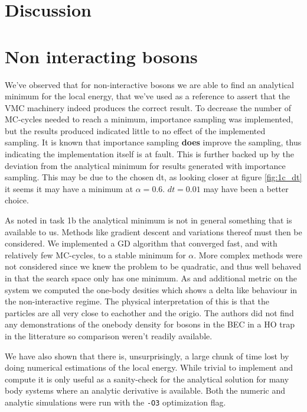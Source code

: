 \section{Discussion}
\section{Non interacting bosons}

We've observed that for non-interactive bosons we are able to find an analytical minimum for the local energy, that we've used as a reference to assert that the VMC machinery indeed produces the correct result. To decrease the number of MC-cycles needed to reach a minimum, importance sampling was implemented, but the results produced indicated little to no effect of the implemented sampling.
It is known that importance sampling \textbf{does} improve the sampling, thus indicating the implementation itself is at fault. This is further backed up by the deviation from the analytical minimum
for results generated with importance sampling. This may be due to the chosen dt, as looking closer at figure \ref{fig:1c_dt} it seems it may have a minimum at $\alpha = 0.6$. $dt = 0.01$ may have been
a better choice.

As noted in task 1b the analytical minimum is not in general something that is available to us.
Methods like gradient descent and variations thereof must then be considered. We implemented a GD algorithm that converged fast, and with relatively few MC-cycles, to a stable minimum for $\alpha$. More complex methods were not considered since we knew the problem to be quadratic, and thus well behaved in that the search space only has one minimum. 
As and additional metric on the system we computed the one-body desities which shows a delta like behaviour in the non-interactive regime. The physical interpretation of this is that the particles are all very close to eachother and the origio. The authors did not find any demonstrations of the onebody density for bosons in the BEC in a HO trap in the litterature so comparison weren't readily available. 

We have also shown that there is, unsurprisingly, a large chunk of time lost by doing numerical estimations of the local energy. While trivial to implement and compute it is only useful as a sanity-check for the analytical solution for many body systems where an analytic derivative is available. Both the numeric and analytic simulations were run with the \lstinline{-O3} optimization flag. 


